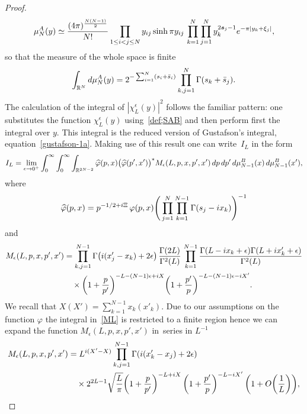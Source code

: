 \documentclass[11pt]{article}
\numberwithin{equation}{section}
\numberwithin{equation}{section}
\begin{document}
\begin{proof}
\begin{gather*}
\mu^A_N(y) \simeq \frac{(4\pi)^{\frac{N(N-1)}2}}{ N!}
\prod_{1\leq i<j\leq N} y_{ij}\sinh\pi y_{ij}\, \prod_{k=1}^N\prod_{j=1}^N y_k^{2\boldsymbol s_j-1}{\rm e}^{-\pi|y_k+\xi_j|},
\end{gather*}
so that the measure of the whole space is finite
\begin{gather*}
\int_{\mathbb R^N}{\rm d}\mu_N^A(y)=2^{-\sum_{i=1}^N (s_i+\bar s_i)}\prod_{k,j=1}^N\Gamma(s_k+\bar s_j).
\end{gather*}
The calculation of the integral of $|\chi_L^\epsilon(y)|^2$ follows the familiar pattern: one substitutes the function $\chi^\epsilon_L(y)$
using~\eqref{def;SAB} and then perform first the integral over $y$. This integral is the reduced version of Gustafson's integral,
equation~\eqref{gustafson-1a}. Making use of this result one can write~$I_L$ in the form
\begin{gather*}
I_L=\lim_{\epsilon\to 0^+}\int_0^\infty \int_0^\infty \int_{\mathbb R^{2N-2}}\widehat \varphi(p,x)\big(\widehat\varphi(p',x')\big)^*
 M_\epsilon(L,p,x,p',x') \,{\rm d}p \,{\rm d}p' \,{\rm d}\mu_{N-1}^B(x)\,{\rm d}\mu_{N-1}^B(x'),
\end{gather*}
where
\begin{gather*}
\widehat\varphi(p,x)=p^{-1/2+{\rm i}\Xi}\,{\varphi(p,x)}\Bigg(\prod_{j=1}^N\prod_{k=1}^{N-1} \Gamma(s_j-{\rm i}x_k)\Bigg)^{-1}
\end{gather*}
and
\begin{align}
M_\epsilon(L,p,x,p',x')&
=\prod_{k,j=1}^{N-1}\Gamma\big({\rm i}(x'_j-x_k)+2\epsilon\big)\,\frac{\Gamma(2L)}{\Gamma^2(L)}\,
\prod_{k=1}^{N-1} \frac{\Gamma(L-{\rm i}x_k+\epsilon) \Gamma(L+{\rm i}x'_k+\epsilon)}{\Gamma^2(L)}\notag
\\
&\quad\times \bigg(1+\frac p{p'}\bigg)^{-L-(N-1)\epsilon+{\rm i}X}
\bigg(1+\frac{p'}p\bigg)^{-L-(N-1)\epsilon-{\rm i}X'}.\label{ML}
\end{align}
We recall that $X(X')=\sum_{k=1}^{N-1}x_k (x'_k)$. Due to our assumptions on the function $\varphi$ the integral in~\eqref{ML} is
restricted to a finite region hence we can expand the function $M_\epsilon(L,p,x,p',x')$ in~series in $L^{-1}$
\begin{align}\label{MLL}
M_\epsilon(L,p,x,p',x') & =L^{{\rm i}(X'-X)}\prod_{k,j=1}^{N-1}\Gamma({\rm i}(x'_k-x_j)+2\epsilon)
\notag\\
&\quad\times
 2^{2L-1}
\sqrt{\frac{L}\pi}\bigg(1+\frac p{p'}\bigg)^{-L+{\rm i}X}
\,\bigg(1+\frac{p'}p\bigg)^{-L-{\rm i}X'} \,\bigg(1+O\bigg(\frac1L\bigg)\bigg),

\end{align}
\end{proof}
\end{document}
